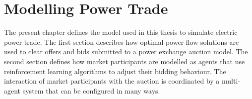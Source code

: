 \chapter{Modelling Power Trade}
\label{ch:method}
The present chapter defines the model used in this thesis to simulate electric
power trade. The first section describes how optimal power flow solutions
are used to clear offers and bids submitted to a power exchange auction model.
The second section defines how market participants are modelled as agents that
use reinforcement learning algorithms to adjust their bidding behaviour.
The interaction of market participants with the auction is coordinated by a
multi-agent system that can be configured in many ways.

%
%
